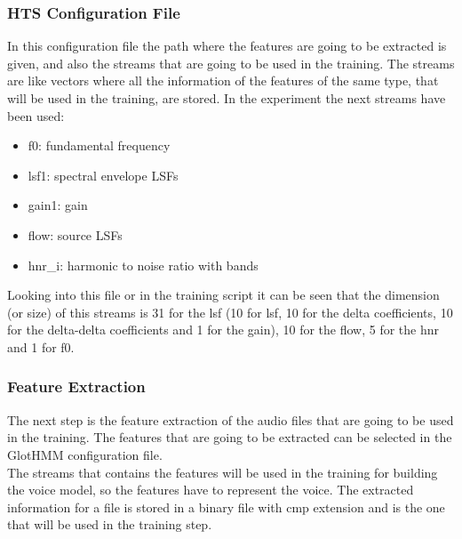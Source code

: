 \subsubsection{HTS Configuration File}\label{htscfile}
In this configuration file the path where the features are going to be extracted is given, and also the streams that are going to be used in the training. The streams are like vectors where all the information of the features of the same type, that will be used in the training, are stored. In the experiment the next streams have been used:
\begin{itemize}
	\item f0: fundamental frequency
	\item lsf1: spectral envelope LSFs
	\item gain1: gain
	\item flow: source LSFs
	\item hnr\_i: harmonic to noise ratio with bands
\end{itemize}
Looking into this file or in the training script it can be seen that the dimension (or size) of this streams is 31 for the lsf (10 for lsf, 10 for the delta coefficients, 10 for the delta-delta coefficients and 1 for the gain), 10 for the flow, 5 for the hnr and 1 for f0.
\subsubsection{Feature Extraction}\label{fea}
The next step is the feature extraction of the audio files that are going to be used in the training. The features that are going to be extracted can be selected in the GlotHMM configuration file.\\
The streams that contains the features will be used in the training for building the voice model, so the features have to represent the voice.
The extracted information for a file is stored in a binary file with cmp extension and is the one that will be used in the training step.
